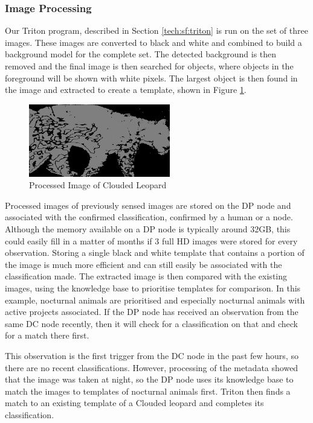 		\subsubsection{Image Processing}
			Our Triton program, described in Section \ref{tech:sf:triton} is run on the set of three images. These images are converted to black and white and combined to build a background model for the complete set. The detected background is then removed and the final image is then searched for objects, where objects in the foreground will be shown with white pixels. The largest object is then found in the image and extracted to create a template, shown in Figure \ref{clproc}.
			
			\begin{figure}[!t]
			\centering
			\includegraphics[width=0.55\textwidth]{Chap4/figures/leopard_proc}
			\caption{Processed Image of Clouded Leopard}
			\label{clproc}
			\end{figure}
			
			Processed images of previously sensed images are stored on the DP node and associated with the confirmed classification, confirmed by a human or a node. Although the memory available on a DP node is typically around 32GB, this could easily fill in a matter of months if 3 full HD images were stored for every observation. Storing a single black and white template that contains a portion of the image is much more efficient and can still easily be associated with the classification made. The extracted image is then compared with the existing images, using the knowledge base to prioritise templates for comparison. In this example, nocturnal animals are prioritised and especially nocturnal animals with active projects associated. If the DP node has received an observation from the same DC node recently, then it will check for a classification on that and check for a match there first.
			
			This observation is the first trigger from the DC node in the past few hours, so there are no recent classifications. However, processing of the metadata showed that the image was taken at night, so the DP node uses its knowledge base to match the images to templates of nocturnal animals first. Triton then finds a match to an existing template of a Clouded leopard and completes its classification.
	
